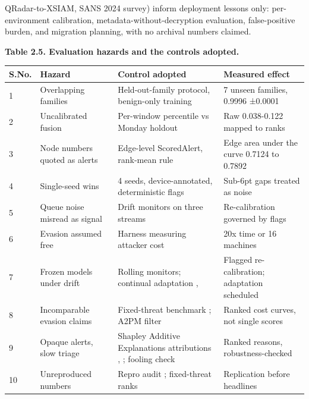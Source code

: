 QRadar-to-XSIAM, SANS 2024 survey) inform deployment lessons only: per-environment calibration, metadata-without-decryption evaluation, false-positive burden, and migration planning, with no archival numbers claimed.

\begin{center}\textbf{Table 2.5. Evaluation hazards and the controls adopted.}\end{center}

\begin{center}
\begin{tabular}{llll}
\toprule

S.No. & Hazard & Control adopted & Measured effect \\

\midrule

1 & Overlapping families \cite{k4} & Held-out-family protocol, benign-only training & 7 unseen families, 0.9996 ±0.0001 \\

2 & Uncalibrated fusion & Per-window percentile vs Monday holdout & Raw 0.038-0.122 mapped to ranks \\

3 & Node numbers quoted as alerts & Edge-level ScoredAlert, rank-mean rule & Edge area under the curve 0.7124 to 0.7892 \\

4 & Single-seed wins & 4 seeds, device-annotated, deterministic flags & Sub-6pt gaps treated as noise \\

5 & Queue noise misread as signal & Drift monitors on three streams \cite{k28} & Re-calibration governed by flags \\

6 & Evasion assumed free \cite{k30} & Harness measuring attacker cost & 20x time or 16 machines \\

7 & Frozen models under drift & Rolling monitors; continual adaptation \cite{k34}, \cite{k35} & Flagged re-calibration; adaptation scheduled \\

8 & Incomparable evasion claims & Fixed-threat benchmark \cite{k31}; A2PM filter \cite{k33} & Ranked cost curves, not single scores \\

9 & Opaque alerts, slow triage & Shapley Additive Explanations attributions \cite{k29}, \cite{k36}; fooling check \cite{k37} & Ranked reasons, robustness-checked \\

10 & Unreproduced numbers & Repro audit \cite{k23}; fixed-threat ranks \cite{k31} & Replication before headlines \\

\bottomrule
\end{tabular}
\end{center}


